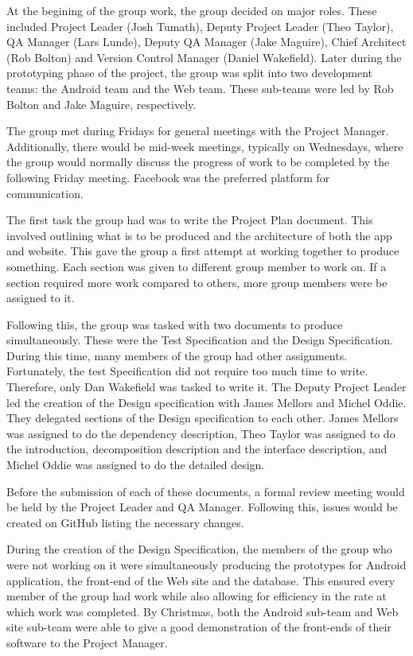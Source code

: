 \documentclass{project}
\begin{document}
At the begining of the group work, the group decided on major roles. These included Project Leader (Josh Tumath), Deputy Project Leader (Theo Taylor), QA Manager (Lars Lunde), Deputy QA Manager (Jake Maguire), Chief Architect (Rob Bolton) and Version Control Manager (Daniel Wakefield). Later during the prototyping phase of the project, the group was split into two development teams: the Android team and the Web team. These sub-teams were led by Rob Bolton and Jake Maguire, respectively.

The group met during Fridays for general meetings with the Project Manager. Additionally, there would be mid-week meetings, typically on Wednesdays, where the group would normally discuss the progress of work to be completed by the following Friday meeting. Facebook was the preferred platform for communication.

The first task the group had was to write the Project Plan document. This involved outlining what is to be produced and the architecture of both the app and website. This gave the group a first attempt at working together to produce something. Each section was given to different group member to work on. If a section required more work compared to others, more group members were be assigned to it.

Following this, the group was tasked with two documents to produce simultaneously. These were the Test Specification and the Design Specification. During this time, many members of the group had other assignments. Fortunately, the test Specification did not require too much time to write. Therefore, only Dan Wakeﬁeld was tasked to write it. The Deputy Project Leader led the creation of the Design specification with James Mellors and Michel Oddie. They delegated sections of the Design specification to each other. James Mellors was assigned to do the dependency description, Theo Taylor was assigned to do the introduction, decomposition description and the interface description, and Michel Oddie was assigned to do the detailed design.

Before the submission of each of these documents, a formal review meeting would be held by the Project Leader and QA Manager. Following this, issues would be created on GitHub listing the necessary changes.

During the creation of the Design Specification, the members of the group who were not working on it were simultaneously producing the prototypes for Android application, the front-end of the Web site and the database. This ensured every member of the group had work while also allowing for efficiency in the rate at which work was completed. By Christmas, both the Android sub-team and Web site sub-team were able to give a good demonstration of the front-ends of their software to the Project Manager.
\end{document}
